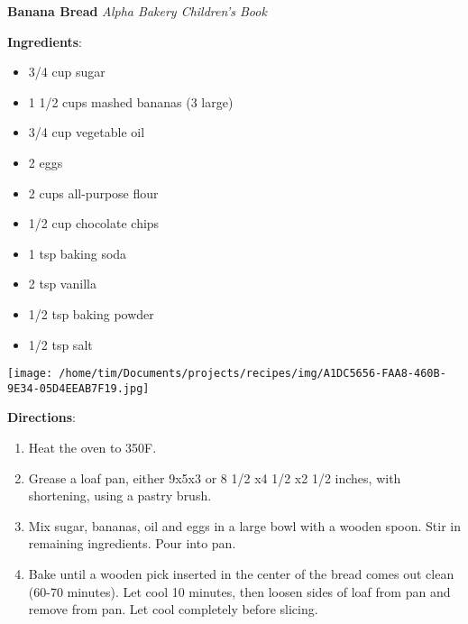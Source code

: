 \documentclass[11pt, twoside, openany]{book}
\begin{document}
\noindent\begin{minipage}[t]{\linewidth}%
{\Large\textbf{Banana Bread}} \label{banana-bread}\hfill\textit{Alpha Bakery Children's Book}\\
\noindent\begin{minipage}[t]{0.78\linewidth}%
\textbf{Ingredients}:\vspace{-3mm}
\begin{multicols}{2}
\begin{itemize}\setlength\itemsep{-1mm}
\item 3/4 cup sugar
\item 1 1/2 cups mashed bananas (3 large)
\item 3/4 cup vegetable oil
\item 2 eggs
\item 2 cups all-purpose flour
\item 1/2 cup chocolate chips
\item 1 tsp baking soda
\item 2 tsp vanilla
\item 1/2 tsp baking powder
\item 1/2 tsp salt
\end{itemize}
\end{multicols}
\end{minipage}
\noindent\begin{minipage}[t]{0.18\linewidth}
\centering \strut\vspace*{-\baselineskip}\newline
\texttt{[image: /home/tim/Documents/projects/recipes/img/A1DC5656-FAA8-460B-9E34-05D4EEAB7F19.jpg]}\\
\end{minipage}\vspace{3mm}
\textbf{Directions}:
\vspace{-3mm}\begin{enumerate}\setlength\itemsep{-1mm}
\item Heat the oven to 350F.
\item Grease a loaf pan, either 9x5x3 or 8 1/2 x4 1/2 x2 1/2 inches, with shortening, using a pastry brush.
\item Mix sugar, bananas, oil and eggs in a large bowl with a wooden spoon. Stir in remaining ingredients. Pour into pan.
\item Bake until a wooden pick inserted in the center of the bread comes out clean (60-70 minutes). Let cool 10 minutes, then loosen sides of loaf from pan and remove from pan. Let cool completely before slicing. 
\end{enumerate}
\end{minipage}\vspace{8mm}
\end{document}
